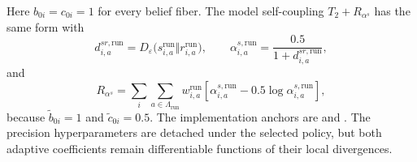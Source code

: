 Here $b_{0i}=c_{0i}=1$ for every belief fiber. The model self-coupling $T_2+R_{\alpha^s}$ has the same form with
\begin{equation}
 d_{i,a}^{sr,\mathrm{run}}
 =D_\varepsilon\bigl(s_{i,a}^{\mathrm{run}}\Vert
 r_{i,a}^{\mathrm{run}}\bigr),
 \qquad
 \alpha_{i,a}^{s,\mathrm{run}}
 =\frac{0.5}{1+d_{i,a}^{sr,\mathrm{run}}},
\end{equation}
and
\begin{equation}
 R_{\alpha^s}
 =\sum_i\sum_{a\in\Lambda_{\mathrm{run}}}w_{i,a}^{\mathrm{run}}
 \left[\alpha_{i,a}^{s,\mathrm{run}}
 -0.5\log\alpha_{i,a}^{s,\mathrm{run}}\right],
\end{equation}
because $\widetilde b_{0i}=1$ and $\widetilde c_{0i}=0.5$. The implementation anchors are  and . The precision hyperparameters are detached under the selected policy, but both adaptive coefficients remain differentiable functions of their local divergences.

